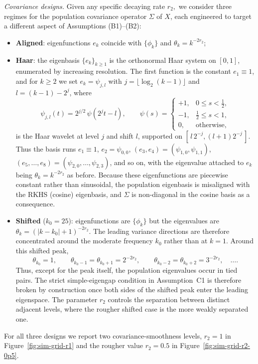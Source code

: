 \documentclass[aos]{imsart}
\theoremstyle{plain}
\theoremstyle{definition}
\theoremstyle{definition}
\begin{document}
\medskip\noindent\textit{Covariance designs.}
Given any specific decaying rate $r_2,$ we consider three regimes for the population covariance operator $\Sigma$ of $X$, each engineered to target a different aspect of Assumptions (B1)--(B2):
\begin{itemize}
\item \textbf{Aligned}: eigenfunctions $e_k$ coincide with $\{\phi_k\}$ and $\theta_k=k^{-2r_2}$;
\item \textbf{Haar}: the eigenbasis $\{e_k\}_{k\ge 1}$ is the orthonormal Haar system on $[0,1]$, enumerated by increasing resolution. The first function is the constant $e_1\equiv 1$, and for $k\ge 2$ we set $e_k=\psi_{j,l}$ with $j=\lfloor\log_2(k-1)\rfloor$ and $l=(k-1)-2^{j}$, where
\[
\psi_{j,l}(t)=2^{j/2}\,\psi\!\left(2^{j}t-l\right),\qquad
\psi(s)=\begin{cases}+1,&0\le s<\tfrac12,\\[-1pt] -1,&\tfrac12\le s<1,\\[-1pt] 0,&\text{otherwise,}\end{cases}
\]
is the Haar wavelet at level $j$ and shift $l$, supported on $[\,l\,2^{-j},(l+1)2^{-j}\,]$. Thus the basis runs $e_1\equiv 1$, $e_2=\psi_{0,0}$, $(e_3,e_4)=(\psi_{1,0},\psi_{1,1})$, $(e_5,\dots,e_8)=(\psi_{2,0},\dots,\psi_{2,3})$, and so on, with the eigenvalue attached to $e_k$ being $\theta_k=k^{-2r_2}$ as before. Because these eigenfunctions are piecewise constant rather than sinusoidal, the population eigenbasis is misaligned with the RKHS (cosine) eigenbasis, and $\Sigma$ is non-diagonal in the cosine basis as a consequence.
\item \textbf{Shifted} ($k_0=25$): eigenfunctions are $\{\phi_k\}$ but the eigenvalues are $\theta_k=(|k-k_0|+1)^{-2r_2}$. The leading variance directions are therefore concentrated around the moderate frequency $k_0$ rather than at $k=1$. Around this shifted peak,
\[
\theta_{k_0}=1,\qquad
\theta_{k_0-1}=\theta_{k_0+1}=2^{-2r_2},\qquad
\theta_{k_0-2}=\theta_{k_0+2}=3^{-2r_2},\quad \ldots .
\]
Thus, except for the peak itself, the population eigenvalues occur in tied pairs. The strict simple-eigengap condition in Assumption~C1 is therefore broken by construction once both sides of the shifted peak enter the leading eigenspace. The parameter $r_2$ controls the separation between distinct adjacent levels, where the rougher shifted case is the more weakly separated one.
\end{itemize}
For all three designs we report two covariance-smoothness levels, $r_2=1$ in Figure~\ref{fig:sim-grid-r1} and the rougher value $r_2=0.5$ in Figure~\ref{fig:sim-grid-r2-0p5}. 
\end{document}
